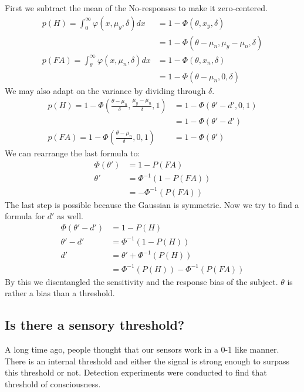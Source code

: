 \documentclass[../main/Notes.tex]{subfiles}
\begin{document}
\bigskip
First we subtract the mean of the No-responses to make it zero-centered. 
\begin{align*}
p(H) = \int_{0}^{\infty} \varphi \left( x,\mu_y,\delta \right)dx &= 1 - \Phi\left(\theta,x_y,\delta\right)\\
                                                                 &= 1 - \Phi\left(\theta-\mu_n,\mu_y-\mu_n,\delta \right)\\ 
p(FA) = \int_{\theta}^{\infty} \varphi \left( x,\mu_n,\delta \right)dx &= 1 - \Phi\left(\theta,x_n,\delta\right)\\
                                                                       &= 1 - \Phi\left(\theta-\mu_n,0,\delta \right)   
\end{align*}
We may also adapt on the variance by dividing through $\delta$.
\begin{align*}
p(H) = 1 - \Phi\left(\frac{\theta-\mu_n}{\delta},\frac{\mu_y-\mu_n}{\delta},1 \right) &= 1 - \Phi\left(\theta'-d',0,1\right)\\
                                                                                      &= 1 - \Phi\left(\theta'-d'\right)\\
p(FA) = 1 - \Phi\left(\frac{\theta-\mu_n}{\delta},0,1 \right) &= 1 - \Phi\left(\theta' \right) 
\end{align*}
We can rearrange the last formula to:
\begin{align*}
\Phi\left(\theta'\right) &= 1 - P(FA)\\
\theta'&=\Phi^{-1}\left(1-P(FA)\right)\\
&=-\Phi^{-1}\left(P(FA)\right)
\end{align*}
The last step is possible because the Gaussian is symmetric. Now we try to find a formula for $d'$ as well. 
\begin{align*}
\Phi\left(\theta'-d'\right) &= 1 - P(H)\\
\theta'-d'&=\Phi^{-1}\left(1-P(H)\right)\\
d' &= \theta'+\Phi^{-1}\left(P(H)\right)\\
   &= \Phi^{-1}\left(P(H)\right)-\Phi^{-1}\left(P(FA)\right)
\end{align*}
By this we disentangled the sensitivity and the response bias of the subject. $\theta$ is rather a bias than a threshold.


\subsection{Is there a sensory threshold?}
A long time ago, people thought that our sensors work in a 0-1 like manner. There is an internal threshold and either the signal is strong enough to surpass this threshold or not. Detection experiments were conducted to find that threshold of consciousness.
\end{document}
